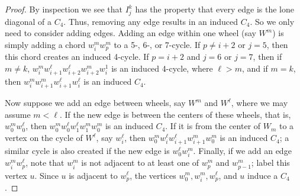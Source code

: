 \documentclass[12pt]{amsart}
\theoremstyle{plain}
\theoremstyle{definition}
\theoremstyle{remark}
\begin{document}
\begin{proof}
By inspection we see that $I_j^k$ has the property that every edge is the lone diagonal of a $C_4$.  Thus, removing any edge results in an induced $C_4$.  So we only need to consider adding edges.  Adding an edge within one wheel (say $W^m$) is simply adding a chord $w_i^m w_p^m$ to a 5-, 6-, or 7-cycle. If $p \neq i+2$ or $j = 5$, then this chord creates an induced 4-cycle. If $p = i+2$ and $j = 6$ or $j =7$, then if $m \neq k$, $w_i^m w_{i+1}^\ell w_{i+2}^\ell w_{i+2}^m w_i^1$ is an induced 4-cycle, where $\ell > m$, and if $m = k$, then $w_i^m w_{i+1}^m w_{i+1}^\ell w_i^\ell$ is an induced $C_4$.

Now suppose we add an edge between wheels, say $W^m$ and $W^\ell$, where we may assume $m < \ell$. If the new edge is between the centers of these wheels, that is, $w_0^m w_0^\ell$, then $w_0^m w_0^\ell w_1^\ell w_1^m w_0^m$ is an induced $C_4$. If it is from the center of $W_m$ to a vertex on the cycle of $W^\ell$, say $w_i^\ell$, then $w_0^m w_i^\ell w_{i+1}^\ell w_{i+1}^m w_0^m$ is an induced $C_4$; a similar cycle is also created if the new edge is $w_0^\ell w_i^m$.
Finally, if we add an edge $w_i^m w_p^\ell$, note that $w_i^m$ is not adjacent to at least one of $w_p^m$ and $w_{p-1}^m$; label this vertex $u$. Since $u$ is adjacent to $w_{p}^\ell$, the vertices $w_0^m, w_i^m, w_p^\ell$, and $u$ induce a $C_4$.
\end{proof}
\end{document}
